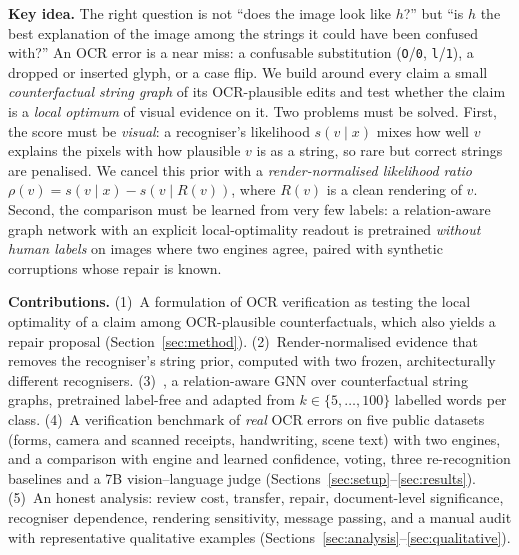 \textbf{Key idea.} The right question is not ``does the image look like $h$?'' but ``is $h$ the best explanation
of the image among the strings it could have been confused with?'' An OCR error is a near miss: a confusable
substitution (\texttt{O}/\texttt{0}, \texttt{l}/\texttt{1}), a dropped or inserted glyph, or a case flip. We build
around every claim a small \emph{counterfactual string graph} of its OCR-plausible edits and test whether the claim is
a \emph{local optimum} of visual evidence on it. Two problems must be solved. First, the score must be \emph{visual}:
a recogniser's likelihood $s(v\mid x)$ mixes how well $v$ explains the pixels with how plausible $v$ is as a string,
so rare but correct strings are penalised. We cancel this prior with a \emph{render-normalised likelihood ratio}
$\rho(v)=s(v\mid x)-s(v\mid R(v))$, where $R(v)$ is a clean rendering of $v$. Second, the comparison must be learned
from very few labels: a relation-aware graph network with an explicit local-optimality readout is pretrained
\emph{without human labels} on images where two engines agree, paired with synthetic corruptions whose repair is known.

\textbf{Contributions.}
(1)~A formulation of OCR verification as testing the local optimality of a claim among OCR-plausible counterfactuals,
which also yields a repair proposal (Section~\ref{sec:method}).
(2)~Render-normalised evidence that removes the recogniser's string prior, computed with two frozen, architecturally
different recognisers.
(3)~\ours{}, a relation-aware GNN over counterfactual string graphs, pretrained label-free and adapted from
$k\in\{5,\dots,100\}$ labelled words per class.
(4)~A verification benchmark of \emph{real} OCR errors on five public datasets (forms, camera and scanned receipts,
handwriting, scene text) with two engines, and a comparison with engine and learned confidence, voting, three
re-recognition baselines and a 7B vision--language judge (Sections~\ref{sec:setup}--\ref{sec:results}).
(5)~An honest analysis: review cost, transfer, repair, document-level significance, recogniser dependence, rendering
sensitivity, message passing, and a manual audit with representative qualitative examples
(Sections~\ref{sec:analysis}--\ref{sec:qualitative}).

